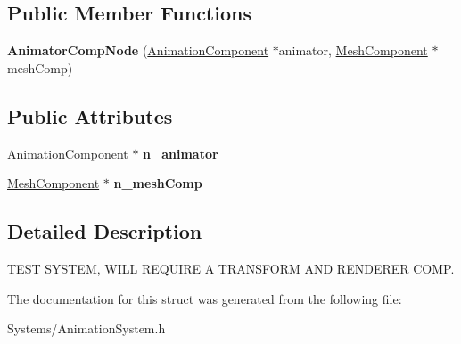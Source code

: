 \subsection*{Public Member Functions}
\begin{DoxyCompactItemize}
\item 
\mbox{\label{structAnimatorCompNode_a9f5b09f07667bc70a032bef987c0520e}} 
{\bfseries Animator\+Comp\+Node} (\hyperlink{classAnimationComponent}{Animation\+Component} $\ast$animator, \hyperlink{classMeshComponent}{Mesh\+Component} $\ast$mesh\+Comp)
\end{DoxyCompactItemize}
\subsection*{Public Attributes}
\begin{DoxyCompactItemize}
\item 
\mbox{\label{structAnimatorCompNode_a1c64b315bbb562b2c8f60a6312cdb5d2}} 
\hyperlink{classAnimationComponent}{Animation\+Component} $\ast$ {\bfseries n\+\_\+animator}
\item 
\mbox{\label{structAnimatorCompNode_a4276b03a7b4bf28ca260170955afd71f}} 
\hyperlink{classMeshComponent}{Mesh\+Component} $\ast$ {\bfseries n\+\_\+mesh\+Comp}
\end{DoxyCompactItemize}


\subsection{Detailed Description}
T\+E\+ST S\+Y\+S\+T\+EM, W\+I\+LL R\+E\+Q\+U\+I\+RE A T\+R\+A\+N\+S\+F\+O\+RM A\+ND R\+E\+N\+D\+E\+R\+ER C\+O\+MP. 

The documentation for this struct was generated from the following file\+:\begin{DoxyCompactItemize}
\item 
Systems/Animation\+System.\+h\end{DoxyCompactItemize}
